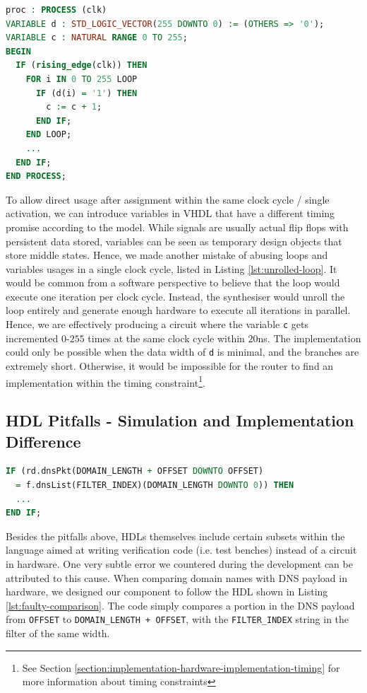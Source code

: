 \documentclass[a4paper]{report}
\newcommand{\proglang}{\textsf}
\newcommand{\code}{\texttt}
\begin{document}
\begin{lstlisting}[language=VHDL, caption=Faulty Unrolled Loop Sample in \proglang{VHDL}, label={lst:unrolled-loop}]
proc : PROCESS (clk)
VARIABLE d : STD_LOGIC_VECTOR(255 DOWNTO 0) := (OTHERS => '0');
VARIABLE c : NATURAL RANGE 0 TO 255;
BEGIN
  IF (rising_edge(clk)) THEN
    FOR i IN 0 TO 255 LOOP
      IF (d(i) = '1') THEN
        c := c + 1;
      END IF;
    END LOOP;
    ... 
  END IF;
END PROCESS;
\end{lstlisting}

To allow direct usage after assignment within the same clock cycle / single activation, we can introduce variables in \proglang{VHDL} that have a different timing promise according to the model. While signals are usually actual flip flops with persistent data stored, variables can be seen as temporary design objects that store middle states. Hence, we made another mistake of abusing loops and variables usages in a single clock cycle, listed in Listing \ref{lst:unrolled-loop}. It would be common from a software perspective to believe that the loop would execute one iteration per clock cycle. Instead, the synthesiser would unroll the loop entirely and generate enough hardware to execute all iterations in parallel. Hence, we are effectively producing a circuit where the variable \code{c} gets incremented $0$-$255$ times at the same clock cycle within $20$ns. The implementation could only be possible when the data width of \code{d} is minimal, and the branches are extremely short. Otherwise, it would be impossible for the router to find an implementation within the timing constraint\footnote{See Section \ref{section:implementation-hardware-implementation-timing} for more information about timing constraints}.

\subsection{HDL Pitfalls - Simulation and Implementation Difference}
\label{section:implementation-hardware-debugging-hdl-pitfalls-simulation-and-implementation}

\begin{lstlisting}[language=VHDL, caption=Faulty \code{STD\_LOGIC\_VECTOR} comparison in \proglang{VHDL}, label={lst:faulty-comparison}]
IF (rd.dnsPkt(DOMAIN_LENGTH + OFFSET DOWNTO OFFSET)
  = f.dnsList(FILTER_INDEX)(DOMAIN_LENGTH DOWNTO 0)) THEN
  ...
END IF;
\end{lstlisting}

Besides the pitfalls above, HDLs themselves include certain subsets within the language aimed at writing verification code (i.e. test benches) instead of a circuit in hardware. One very subtle error we countered during the development can be attributed to this cause. When comparing domain names with DNS payload in hardware, we designed our component to follow the HDL shown in Listing \ref{lst:faulty-comparison}. The code simply compares a portion in the DNS payload from \code{OFFSET} to \code{DOMAIN\_LENGTH + OFFSET}, with the \code{FILTER\_INDEX} string in the filter of the same width.
\end{document}

